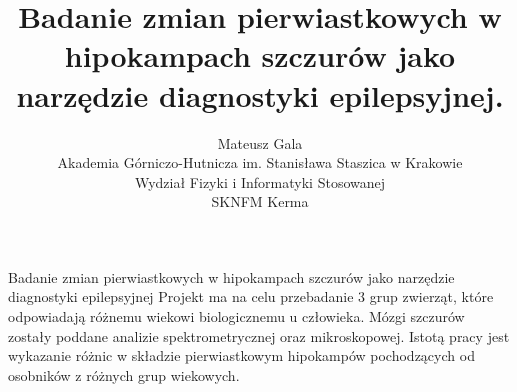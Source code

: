 \documentclass[12pt, a4paper]{article}
\begin{document}
\title{Badanie zmian pierwiastkowych w hipokampach szczurów jako narzędzie diagnostyki epilepsyjnej.}
\author{Mateusz Gala \\   
Akademia Górniczo-Hutnicza im. Stanisława Staszica w Krakowie \\
Wydział Fizyki i Informatyki Stosowanej
\\
SKNFM Kerma}
\date {}
\maketitle
\thispagestyle{title}
Badanie zmian pierwiastkowych w hipokampach szczurów jako narzędzie diagnostyki epilepsyjnej
Projekt ma na celu przebadanie 3 grup zwierząt, które odpowiadają różnemu wiekowi biologicznemu u człowieka. Mózgi szczurów zostały poddane analizie spektrometrycznej oraz mikroskopowej. Istotą pracy jest wykazanie różnic w składzie pierwiastkowym hipokampów pochodzących od osobników z różnych grup wiekowych.
\end{document}
